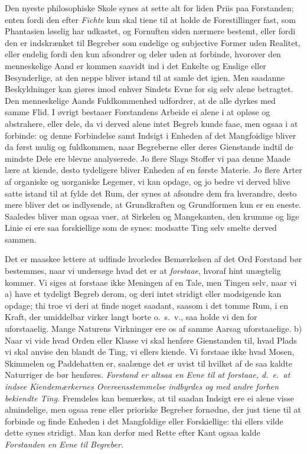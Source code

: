\documentclass[12pt,a4paper]{article}
\newcommand{\opage}[1]{\marginnote{\footnotesize\textit{[#1]}}}
\begin{document}
Den nyeste philosophiske Skole synes at sette alt for liden Priis paa Forstanden; enten
fordi den efter \emph{Fichte} kun skal tiene til at holde de Forestillinger fast, som
Phantasien løselig har udkastet, og Fornuften siden nærmere bestemt, eller fordi den er
indskrænket til Begreber som endelige og subjective Former uden Realitet, eller endelig
fordi den kun afsondrer og deler uden at forbinde, hvorover den menneskelige Aand er
kommen saavidt ind i det Enkelte og Enslige eller Besynderlige, at den neppe bliver
istand til at samle det igien. Men saadanne Beskyldninger kan giøres imod enhver Sindets
Evne for sig selv alene betragtet. Den menneskelige Aands Fuldkommenhed udfordrer, at de
alle dyrkes med samme Flid. I øvrigt bestaaer Forstandens Arbeide ei alene i at opløse og
abstrahere, eller dele, da vi derved alene intet Begreb kunde faae, men ogsaa i at
forbinde: og denne Forbindelse samt Indsigt i Enheden af det Mangfoidige bliver da først
mulig og fuldkommen, naar Begreberne eller deres Gienstande indtil de mindste Dele
\opage{149} ere blevne analyserede. Jo flere Slags Stoffer vi paa denne Maade lære at kiende, desto
tydeligere bliver Enheden af en første Materie. Jo flere Arter af organiske og uorganiske
Legemer, vi kan opdage, og jo bedre vi derved blive satte istand til at fylde det Rum,
der synes at afsondre dem fra hverandre, desto mere bliver det os indlysende, at
Grundkraften og Grundformen kun er en eneste. Saaledes bliver man ogsaa vaer, at Sirkelen
og Mangekanten, den krumme og lige Linie ei ere saa forskiellige som de synes: modsatte
Ting selv smelte derved sammen.

Det er maaskee lettere at udfinde hvorledes Bemærkelsen af det Ord Forstand bør
bestemmes, naar vi undersøge hvad det er at \emph{forstaae}, hvoraf hint unægtelig
kommer. Vi siges at forstaae ikke Meningen af en Tale, men Tingen selv, naar vi a) have
et tydeligt Begreb derom, og deri intet stridigt eller modsigende kan opdage; thi troe vi
deri at finde noget saadant, saasom i det tomme Rum, i en Kraft, der umiddelbar virker
langt borte o.~s.~v., saa holde vi den for uforstaaelig. Mange Naturens Virkninger ere os
af samme Aarsag uforstaaelige. b) Naar vi vide hvad Orden eller Klasse vi skal henføre
Gienstanden til, hvad Plads vi skal anvise den blandt de Ting, vi ellers kiende. Vi
forstaae ikke hvad Mosen, Skimmelen og Paddehatten er, saalænge det er uvist til hvilket
af de saa kaldte Naturriger de bør henføres. \emph{Forstand er altsaa en
\opage{150} Evne til at forstaae, d.~e.\ at indsee Kiendemærkernes Overeensstemmelse indbyrdes og med
andre forhen bekiendte Ting.} Fremdeles kan bemærkes, at til saadan Indsigt ere ei alene
visse almindelige, men ogsaa rene eller prioriske Begreber fornødne, der just tiene til at
forbinde og finde Enheden i det Mangfoldige eller Forskiellige: thi ellers vilde dette
synes stridigt. Man kan derfor med Rette efter Kant ogsaa kalde \emph{Forstanden en Evne
til Begreber.}
\end{document}

